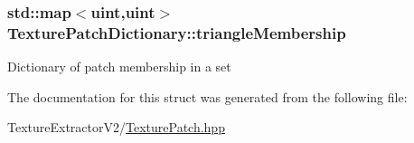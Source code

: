 \subsubsection[{triangle\+Membership}]{\setlength{\rightskip}{0pt plus 5cm}std\+::map$<$uint,uint$>$ Texture\+Patch\+Dictionary\+::triangle\+Membership}\label{struct_texture_patch_dictionary_a188d2b68586a902ef8c969458e9001c6}
Dictionary of patch membership in a set 

The documentation for this struct was generated from the following file\+:\begin{DoxyCompactItemize}
\item 
Texture\+Extractor\+V2/\hyperlink{_texture_patch_8hpp}{Texture\+Patch.\+hpp}\end{DoxyCompactItemize}

